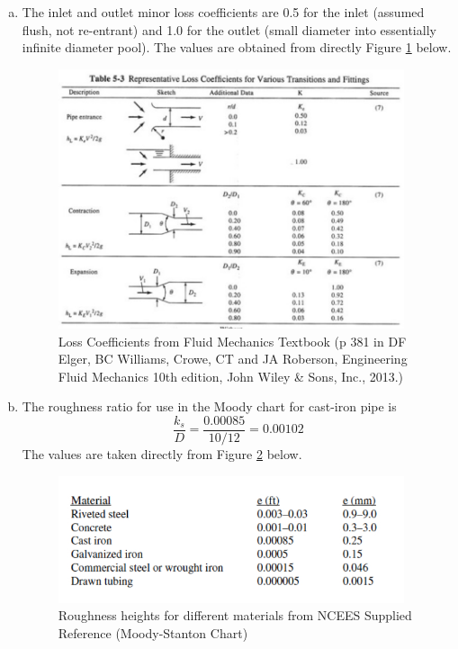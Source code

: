 \documentclass[12pt]{article}
\begin{document}
\begin{enumerate}[a)]
\item The inlet and outlet minor loss coefficients are 0.5 for the inlet (assumed flush, not re-entrant) and 1.0 for the outlet (small diameter into essentially infinite diameter pool).  
The values are obtained from directly Figure \ref{fig:LossCoefficients} below.
\begin{figure}[h!] %
\centering
   \includegraphics[width=4in]{LossCoefficients.jpg}
   \caption{Loss Coefficients from Fluid Mechanics Textbook \newline (p 381 in DF Elger, BC Williams, Crowe, CT and JA Roberson, Engineering Fluid Mechanics 10th edition, John
Wiley \& Sons, Inc., 2013.)}
   \label{fig:LossCoefficients} 
\end{figure}
\item The roughness ratio for use in the Moody chart for cast-iron pipe is 
\begin{equation}
\frac{k_s}{D} = \frac{0.00085}{10/12} = 0.00102
\end{equation}
The values are taken directly from Figure \ref{fig:RoughnessHeights} below.
\begin{figure}[h!] %
\centering
   \includegraphics[width=4in]{RoughnessHeights.jpg}
   \caption{Roughness heights for different materials from NCEES Supplied Reference (Moody-Stanton Chart)}
   \label{fig:RoughnessHeights} 
\end{figure}


\end{enumerate}
\end{document}
